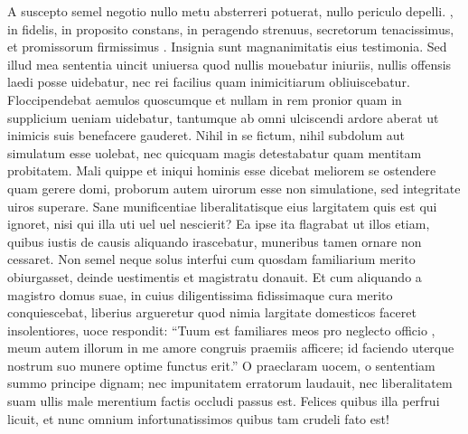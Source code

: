 \documentclass[a5paper,twoside]{article}
\begin{document}
\begin{pages}
\begin{Leftside}
\pend
\pstart
A suscepto semel negotio nullo metu absterreri potuerat, nullo periculo depelli. , in  fidelis, in proposito constans, in peragendo strenuus, secretorum tenacissimus, et promissorum firmissimus . Insignia  sunt magnanimitatis eius testimonia.  Sed illud mea sententia uincit uniuersa quod nullis mouebatur iniuriis, nullis offensis laedi posse uidebatur, nec  rei facilius quam inimicitiarum obliuiscebatur. Floccipendebat aemulos quoscumque et nullam in rem pronior quam in supplicium ueniam uidebatur, tantumque ab omni ulciscendi ardore aberat ut inimicis suis benefacere gauderet. 
\pend
\pstart
Nihil in se fictum, nihil subdolum aut simulatum esse uolebat, nec quicquam magis detestabatur quam mentitam probitatem. Mali quippe et iniqui hominis esse dicebat meliorem se  ostendere quam gerere domi, proborum autem uirorum esse non simulatione, sed integritate uiros superare. Sane munificentiae liberalitatisque eius largitatem quis est qui ignoret, nisi qui illa uti uel  uel nescierit? Ea ipse ita flagrabat ut illos etiam, quibus iustis de causis aliquando irascebatur, muneribus tamen ornare non cessaret. Non semel neque solus interfui cum quosdam familiarium merito obiurgasset, deinde uestimentis et magistratu donauit. Et cum aliquando a magistro domus suae, in cuius diligentissima fidissimaque cura merito conquiescebat, liberius argueretur quod nimia  largitate domesticos faceret insolentiores,  uoce respondit: ``Tuum est familiares meos pro neglecto officio , meum autem  illorum in me amore congruis praemiis afficere; id faciendo uterque nostrum suo munere optime functus erit.'' O praeclaram uocem, o sententiam summo principe dignam; nec impunitatem erratorum laudauit, nec liberalitatem suam ullis male merentium factis occludi passus est. Felices quibus illa perfrui licuit, et nunc omnium infortunatissimos quibus tam crudeli fato  est! 

\end{Leftside}
\end{pages}
\end{document}
